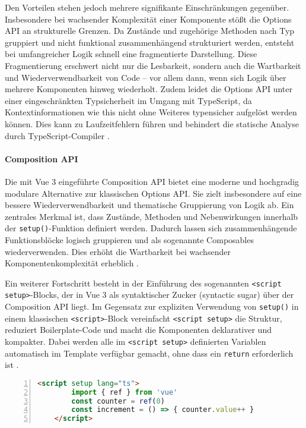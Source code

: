 Den Vorteilen stehen jedoch mehrere signifikante Einschränkungen gegenüber. Insbesondere bei wachsender Komplexität einer Komponente stößt die Options API an strukturelle Grenzen. Da Zustände und zugehörige Methoden nach Typ gruppiert und nicht funktional zusammenhängend strukturiert werden, entsteht bei umfangreicher Logik schnell eine fragmentierte Darstellung. Diese Fragmentierung erschwert nicht nur die Lesbarkeit, sondern auch die Wartbarkeit und Wiederverwendbarkeit von Code – vor allem dann, wenn sich Logik über mehrere Komponenten hinweg wiederholt. Zudem leidet die Options API unter einer eingeschränkten Typsicherheit im Umgang mit TypeScript, da Kontextinformationen wie this nicht ohne Weiteres typensicher aufgelöst werden können. Dies kann zu Laufzeitfehlern führen und behindert die statische Analyse durch TypeScript-Compiler \cite{VueGuide2024}.

\paragraph{Composition API}
Die mit Vue 3 eingeführte Composition API bietet eine moderne und hochgradig modulare Alternative zur klassischen Options API. Sie zielt insbesondere auf eine bessere Wiederverwendbarkeit und thematische Gruppierung von Logik ab. Ein zentrales Merkmal ist, dass Zustände, Methoden und Nebenwirkungen innerhalb der \texttt{setup()}-Funktion definiert werden. Dadurch lassen sich zusammenhängende Funktionsblöcke logisch gruppieren und als sogenannte Composables wiederverwenden. Dies erhöht die Wartbarkeit bei wachsender Komponentenkomplexität erheblich \cite{CompositionAPIFAQ}.

Ein weiterer Fortschritt besteht in der Einführung des sogenannten \texttt{<script setup>}-Blocks, der in Vue 3 als syntaktischer Zucker (syntactic sugar) über der Composition API liegt. Im Gegensatz zur expliziten Verwendung von \texttt{setup()} in einem klassischen \texttt{<script>}-Block vereinfacht \texttt{<script setup>} die Struktur, reduziert Boilerplate-Code und macht die Komponenten deklarativer und kompakter. Dabei werden alle im \texttt{<script setup>} definierten Variablen automatisch im Template verfügbar gemacht, ohne dass ein \texttt{return} erforderlich ist \cite{ScriptSetup}.

\begin{lstlisting}[caption=Beispiel für die Composition API mit \texttt{<script setup>},numbers=left,label=lst:scriptsetup,language=html]
	<script setup lang="ts"> 
		import { ref } from 'vue' 
		const counter = ref(0) 
		const increment = () => { counter.value++ } 
	</script>
	\end{lstlisting}

